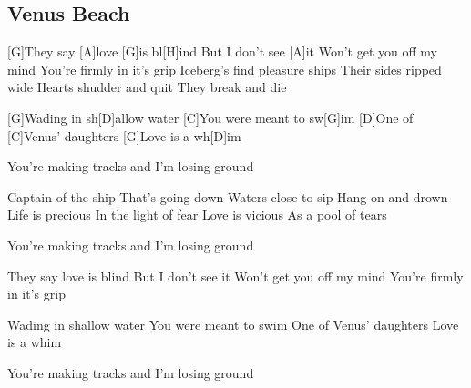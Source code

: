 \subsection*{Venus Beach   }
\begin{guitar}

[G]They say [A]love [G]is bl[H]ind
But I don't see [A]it
Won't get you off my mind
You're firmly in it's grip
Iceberg's find pleasure ships
Their sides ripped wide
Hearts shudder and quit
They break and die

[G]Wading in sh[D]allow water
[C]You were meant to sw[G]im
[D]One of [C]Venus' daughters
[G]Love is a wh[D]im

You're making tracks and I'm losing ground

Captain of the ship
That's going down
Waters close to sip
Hang on and drown
Life is precious
In the light of fear
Love is vicious
As a pool of tears

You're making tracks and I'm losing ground

They say love is blind
But I don't see it
Won't get you off my mind
You're firmly in it's grip

Wading in shallow water
You were meant to swim
One of Venus' daughters
Love is a whim

You're making tracks and I'm losing ground

\end{guitar}
